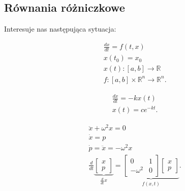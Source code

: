 \documentclass[../main.tex]{subfiles}
\begin{document}
    \subsection{Równania różniczkowe}
    Interesuje nas następująca sytuacja:

    \begin{align*}
        &\frac{dx}{dt} = f(t,x) \\
        &x(t_0)= x_0\\
        &x(t): [a,b]\to\mathbb{R}\\
        &f: [a,b]\times \mathbb{R}^n\to\mathbb{R}^n
    .\end{align*}

    \begin{przyklad}
        \begin{align*}
            &\frac{dx}{dt} = -kx(t)\\
            &x(t) = c e^{-kt}
        .\end{align*}
    \end{przyklad}

    \begin{przyklad}
        \begin{align*}
            &\ddot{x} + \omega^2 x = 0\\
            &\dot{x} = p\\
            &\dot{p} = \ddot{x} = -\omega^2 x\\
            &\frac{d}{dt} \underbrace{\begin{bmatrix} x\\p \end{bmatrix}}_{\frac{d}{dt}x} = \underbrace{\begin{bmatrix} 0&1\\ -\omega^2&0 \end{bmatrix} \begin{bmatrix} x\\p \end{bmatrix}}_{f(x,t)}
        .\end{align*}
    \end{przyklad}
\end{document}
